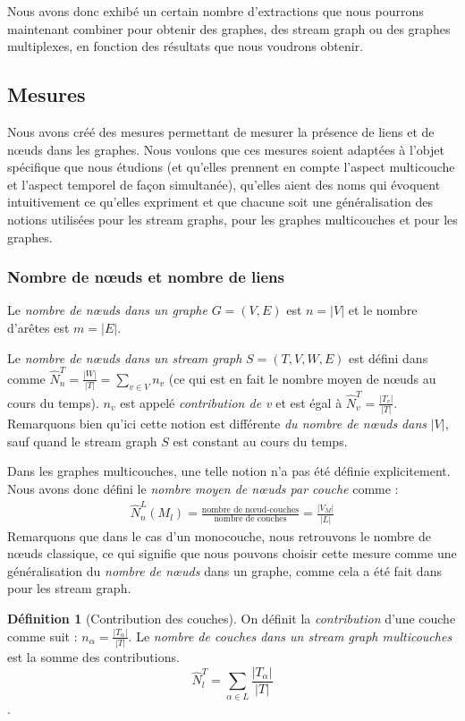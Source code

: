 \documentclass[11pt,a4paper]{article}
\theoremstyle{definition}
\newtheorem{defn}{Définition}
\theoremstyle{remark}
\theoremstyle{remark}
\def \stg {stream graph}
\def \stgm {stream graph multicouches}
\def \stgs {stream graphs}
\begin{document}
Nous avons donc exhibé un certain nombre d'extractions que nous pourrons maintenant combiner pour obtenir des graphes, des \stg{} ou des graphes multiplexes, en fonction des résultats que nous voudrons obtenir.

\subsection{Mesures}


Nous avons créé des mesures permettant de mesurer la présence de liens et de nœuds dans les graphes. Nous voulons que ces mesures soient adaptées à l'objet spécifique que nous étudions (et qu'elles prennent en compte l'aspect multicouche et l'aspect temporel de façon simultanée), qu'elles aient des noms qui évoquent intuitivement ce qu'elles expriment et que chacune soit une généralisation des notions utilisées pour les \stgs{}, pour les graphes multicouches et pour les graphes.

	\subsubsection{Nombre de nœuds et nombre de liens}
	Le {\em nombre de n\oe{}uds dans un graphe} $G=(V,E)$ est $n=|V|$ et le nombre d'arêtes est $m=|E|$.
	
	Le {\em nombre de n\oe{}uds dans un \stg{}} $S=(T,V,W,E)$ est défini dans \cite{stream} comme $\hat{N}^T_n=\frac{|W|}{|T|}=\sum_{v\in V} n_v$ (ce qui est en fait le nombre moyen de n\oe{}uds au cours du temps). $n_v$ est appelé {\em contribution de v} et est égal à $\hat{N}^T_v=\frac{|T_v|}{|T|}$. Remarquons bien qu'ici cette notion est différente {\em du nombre de n\oe{}uds dans} $|V|$, sauf quand le \stg{} $S$ est constant au cours du temps.
	\newline
	
	Dans les graphes multicouches, une telle notion n'a pas été définie explicitement.
	Nous avons donc défini le {\em nombre moyen de n\oe{}uds par couche} comme :
	\begin{align*}
		\hat{N}_n^L(M_l) = \frac{\text{nombre de n\oe{}ud-couches}}{\text{nombre de couches}}=\frac{|V_M|}{|L|}
	\end{align*}	    
	Remarquons que dans le cas d'un monocouche, nous retrouvons le nombre de n\oe{}uds classique, ce qui signifie que nous pouvons choisir cette mesure comme une généralisation du {\em nombre de nœuds} dans un graphe, comme cela a été fait dans \cite{stream} pour les \stg{}.
		
	
	\begin{defn}[Contribution des couches]
	On définit la {\em contribution} d'une couche comme suit : $n_\alpha = \frac{|T_{\alpha}|}{|T|}$. Le {\em nombre de couches dans un \stgm{}} est la somme des contributions. $$\hat{N}^T_l = \sum_{\alpha \in L}\frac{ |T_{\alpha}|}{|T|}$$.
    \end{defn}
	
\end{document}
